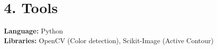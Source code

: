 \documentclass{report}
\begin{document}
\section*{4. Tools}

\textbf{Language:} Python\\

\textbf{Libraries:} OpenCV (Color detection), Scikit-Image (Active Contour)\\
\end{document}
